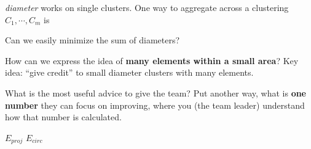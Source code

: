 \vfill

\textit{diameter} works on single clusters. One way to aggregate across a
clustering $C_1, \cdots, C_m$ is \underline{\hspace{15em}}

Can we easily minimize the sum of diameters?

\vfill

How can we express the idea of {\bf many elements within a small area}? Key idea: ``give credit'' to small diameter clusters with many elements.

\vfill

What is the most useful advice to give the team? Put another way, what is {\bf one number} they can focus on improving, where you (the team leader) understand how that number is calculated.

\vfill



$E_{proj}$
$E_{circ}$